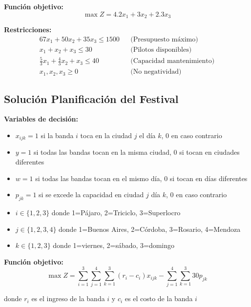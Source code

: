 \documentclass[12pt]{article}
\begin{document}
\textbf{Función objetivo:}
$$\max Z = 4.2x_1 + 3x_2 + 2.3x_3$$

\textbf{Restricciones:}
\begin{align*}
    67x_1 + 50x_2 + 35x_3 \leq 1500 && \text{(Presupuesto máximo)} \\
    x_1 + x_2 + x_3 \leq 30 && \text{(Pilotos disponibles)} \\
    \frac{5}{3}x_1 + \frac{4}{3}x_2 + x_3 \leq 40 && \text{(Capacidad mantenimiento)} \\
    x_1, x_2, x_3 \geq 0 && \text{(No negatividad)}
\end{align*}

\subsection{Solución Planificación del Festival}

\textbf{Variables de decisión:}
\begin{itemize}
    \item $x_{ijk} = 1$ si la banda $i$ toca en la ciudad $j$ el día $k$, 0 en caso contrario
    \item $y = 1$ si todas las bandas tocan en la misma ciudad, 0 si tocan en ciudades diferentes
    \item $w = 1$ si todas las bandas tocan en el mismo día, 0 si tocan en días diferentes
    \item $p_{jk} = 1$ si se excede la capacidad en ciudad $j$ día $k$, 0 en caso contrario
    \item $i \in \{1, 2, 3\}$ donde 1=Pájaro, 2=Triciclo, 3=Superlocro
    \item $j \in \{1, 2, 3, 4\}$ donde 1=Buenos Aires, 2=Córdoba, 3=Rosario, 4=Mendoza
    \item $k \in \{1, 2, 3\}$ donde 1=viernes, 2=sábado, 3=domingo
\end{itemize}

\textbf{Función objetivo:}
$$\max Z = \sum_{i=1}^{3} \sum_{j=1}^{4} \sum_{k=1}^{3} (r_i - c_i) x_{ijk} - \sum_{j=1}^{4} \sum_{k=1}^{3} 30p_{jk}$$
\begin{center}
donde $r_i$ es el ingreso de la banda $i$ y $c_i$ es el costo de la banda $i$
\end{center}
\end{document}
